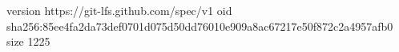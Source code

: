 version https://git-lfs.github.com/spec/v1
oid sha256:85ee4fa2da73def0701d075d50dd76010e909a8ac67217e50f872c2a4957afb0
size 1225
